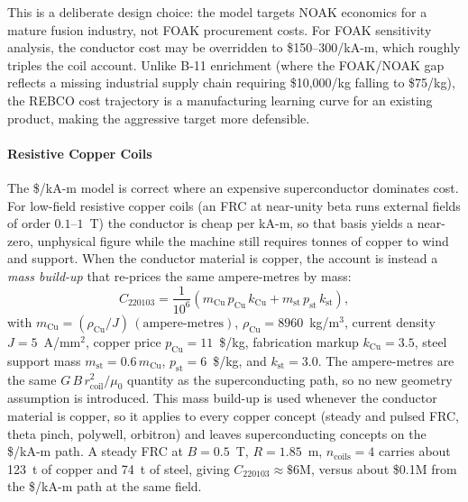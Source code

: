 \documentclass{article}
\begin{document}
This is a deliberate design choice: the model targets NOAK economics
for a mature fusion industry, not FOAK procurement costs. For FOAK
sensitivity analysis, the conductor cost may be overridden to
\$150--300/kA-m, which roughly triples the coil account.
Unlike B-11 enrichment (where the FOAK/NOAK gap reflects a missing
industrial supply chain requiring \$10{,}000/kg falling to \$75/kg), the
REBCO cost trajectory is a manufacturing learning curve for an
existing product, making the aggressive target more defensible.

\paragraph{Resistive Copper Coils}
The \$/kA-m model is correct where an expensive superconductor dominates
cost. For low-field resistive copper coils (an FRC at near-unity beta
runs external fields of order $0.1$--$1$~T) the conductor is cheap per
kA-m, so that basis yields a near-zero, unphysical figure while the
machine still requires tonnes of copper to wind and support. When the
conductor material is copper, the account is instead a \emph{mass
build-up} that re-prices the same ampere-metres by mass:
\begin{equation}
  C_{220103} = \frac{1}{10^6}\left( m_{\text{Cu}}\, p_{\text{Cu}}\, k_{\text{Cu}}
    + m_{\text{st}}\, p_{\text{st}}\, k_{\text{st}} \right),
\end{equation}
with $m_{\text{Cu}} = (\rho_{\text{Cu}}/J)\,(\text{ampere-metres})$,
$\rho_{\text{Cu}} = 8960$~kg/m$^3$, current density $J = 5$~A/mm$^2$,
copper price $p_{\text{Cu}} = 11$~\$/kg, fabrication markup
$k_{\text{Cu}} = 3.5$, steel support mass $m_{\text{st}} = 0.6\,m_{\text{Cu}}$,
$p_{\text{st}} = 6$~\$/kg, and $k_{\text{st}} = 3.0$. The ampere-metres
are the same $G\,B\,r_{\text{coil}}^2/\mu_0$ quantity as the
superconducting path, so no new geometry assumption is introduced. This
mass build-up is used whenever the conductor material is copper, so it
applies to every copper concept (steady and pulsed FRC, theta pinch,
polywell, orbitron) and leaves superconducting concepts on the
\$/kA-m path. A steady FRC at
$B = 0.5$~T, $R = 1.85$~m, $n_{\text{coils}} = 4$ carries about 123~t of
copper and 74~t of steel, giving $C_{220103} \approx \$6$M, versus about
\$0.1M from the \$/kA-m path at the same field.
\end{document}
